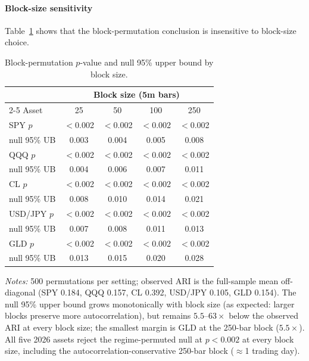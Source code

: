 \documentclass[preprint,12pt,authoryear]{elsarticle}
\begin{document}
\paragraph{Block-size sensitivity}
Table~\ref{tab:block_sweep} shows that the block-permutation conclusion is insensitive to block-size choice.

\begin{table}[H]
\centering
\small
\setlength{\tabcolsep}{5pt}
\caption{Block-permutation $p$-value and null 95\% upper bound by block size.}
\label{tab:block_sweep}
\begin{tabular}{lcccc}
\toprule
 & \multicolumn{4}{c}{Block size (5m bars)} \\
\cmidrule(lr){2-5}
Asset & 25 & 50 & 100 & 250 \\
\midrule
SPY $p$ & $<$0.002 & $<$0.002 & $<$0.002 & $<$0.002 \\
\quad null 95\% UB & 0.003 & 0.004 & 0.005 & 0.008 \\
QQQ $p$ & $<$0.002 & $<$0.002 & $<$0.002 & $<$0.002 \\
\quad null 95\% UB & 0.004 & 0.006 & 0.007 & 0.011 \\
CL $p$ & $<$0.002 & $<$0.002 & $<$0.002 & $<$0.002 \\
\quad null 95\% UB & 0.008 & 0.010 & 0.014 & 0.021 \\
USD/JPY $p$ & $<$0.002 & $<$0.002 & $<$0.002 & $<$0.002 \\
\quad null 95\% UB & 0.007 & 0.008 & 0.011 & 0.013 \\
GLD $p$ & $<$0.002 & $<$0.002 & $<$0.002 & $<$0.002 \\
\quad null 95\% UB & 0.013 & 0.015 & 0.020 & 0.028 \\
\bottomrule
\end{tabular}
\par\medskip
{\footnotesize\justifying
\textit{Notes:} 500 permutations per setting; observed ARI is the full-sample mean off-diagonal (SPY 0.184, QQQ 0.157, CL 0.392, USD/JPY 0.105, GLD 0.154). The null 95\% upper bound grows monotonically with block size (as expected: larger blocks preserve more autocorrelation), but remains $5.5$--$63\times$ below the observed ARI at every block size; the smallest margin is GLD at the 250-bar block ($5.5\times$). All five 2026 assets reject the regime-permuted null at $p < 0.002$ at every block size, including the autocorrelation-conservative 250-bar block ($\approx$1 trading day).
\par}
\end{table}
\end{document}
